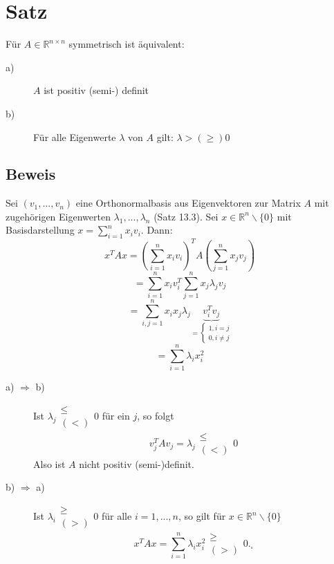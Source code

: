 \documentclass{scrbook}
\begin{document}
\section{Satz}
Für $A \in \mathbb{R}^{n \times n}$ symmetrisch ist äquivalent:
\begin{description}
\item[a)] $A$ ist positiv (semi-) definit
\item[b)] Für alle Eigenwerte $\lambda$ von $A$ gilt: $\lambda > (\geq) 0$
\end{description}
\subsection*{Beweis}
Sei $(v_1,...,v_n)$ eine Orthonormalbasis aus Eigenvektoren zur Matrix $A$ mit zugehörigen Eigenwerten $\lambda_1,...,\lambda_n$ (Satz 13.3). Sei $x \in \mathbb{R}^n\backslash \{0\}$ mit Basisdarstellung $x = \sum^n_{i=1} x_i v_i$. Dann:
\[x^TAx=(\sum^n_{i=1} x_i v_i)^T A (\sum^n_{j=1}x_jv_j)\]
\[=\sum^n_{i=1} x_i v_i^T \sum^n_{j=1}x_j \lambda_j v_j\]
\[ = \sum^n_{i,j=1} x_ix_j\lambda_j \underbrace{v_i^Tv_j}_{
=\left\{
\begin{array}{l}
1, i=j\\
0, i\neq j
\end{array}
\right.
}\]
\[=\sum^n_{i=1} \lambda_i x_i^2\]
\begin{description}
\item[a) $ \Rightarrow$ b)] Ist $ \lambda_j 
\begin{array}{c}
\leq\\
(<)
\end{array} 0$ für ein $j$, so folgt
\[v_j^TAv_j = \lambda_j\begin{array}{c}
\leq\\
(<)
\end{array} 0 \]
Also ist $A$ nicht positiv (semi-)definit.
\item[b) $\Rightarrow$ a)] Ist $\lambda_i \begin{array}{c}
\geq\\
(>)
\end{array} 0$ für alle $i=1,...,n$, so gilt für $x \in \mathbb{R}^n\backslash \{0\}$
\[x^TAx = \sum^n_{i=1} \lambda_i x_i^2 
\begin{array}{c}
\geq\\
(>)
\end{array} 0._\square\]
\end{description}
\end{document}
